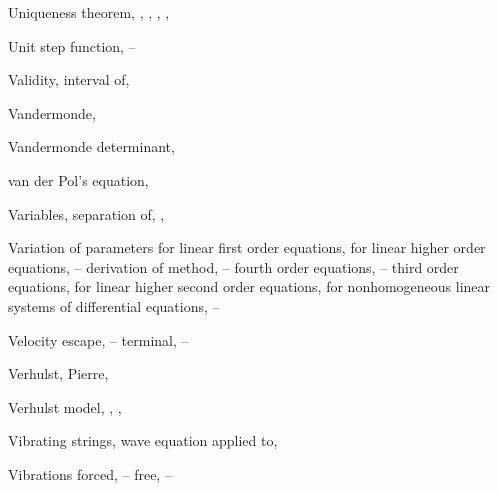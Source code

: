 \begin{theindex}
  \item Uniqueness theorem, \pageref{thmtype:2.1.2}, \pageref{thmtype:2.3.1}, \pageref{thmtype:5.1.1}, \pageref{thmtype:9.1.1}, \pageref{thmtype:10.2.1}

  \item Unit step function, \pageref{thmtype:8.4.1}--\pageref{exer:8.4.36} 

  \item Validity, interval of, \pageref{example:1.2.6}

  \item Vandermonde, \pageref{exer:9.2.39}

  \item Vandermonde determinant, \pageref{exer:9.2.39}

  \item van der Pol's equation, \pageref{exer:4.4.19}

  \item Variables, separation of, \pageref{eq:2.1.16}, \pageref{eq:2.2.1}

  \item Variation of parameters
    \subitem for linear first order equations, \pageref{eq:2.1.16}
    \subitem for linear higher order equations, \pageref{eq:9.4.1}--\pageref{exer:9.4.42}
      \subsubitem derivation of method, \pageref{eq:9.4.1}--\pageref{eq:9.4.5}
      \subsubitem fourth order equations, \pageref{example:9.4.2}--\pageref{exer:9.4.1}
      \subsubitem third order equations, \pageref{eq:9.4.7}
    \subitem for linear higher second order equations, \pageref{eq:5.7.1}
    \subitem for nonhomogeneous linear systems of differential equations, \pageref{thmtype:10.7.1}--\pageref{exer:10.7.23}

  \item Velocity
    \subitem escape, \pageref{eq:4.3.18}--\pageref{eq:4.3.1}
    \subitem terminal, \pageref{example:4.3.1}--\pageref{example:4.3.4}

  \item Verhulst, Pierre, \pageref{eq:1.1.4}

  \item Verhulst model, \pageref{eq:1.1.4}, \pageref{exer:1.3.24}, \pageref{exer:2.4.14}

  \item Vibrating strings, wave equation applied to, \pageref{eq:12.2.1}

  \item Vibrations
    \subitem forced, \pageref{eq:6.2.11}--\pageref{exer:6.2.1}
    \subitem free, \pageref{eq:6.2.1}--\pageref{eq:6.2.11}


\end{theindex}
